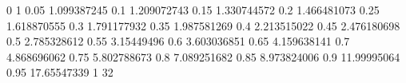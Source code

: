 0 1
0.05 1.099387245
0.1 1.209072743
0.15 1.330744572
0.2 1.466481073
0.25 1.618870555
0.3 1.791177932
0.35 1.987581269
0.4 2.213515022
0.45 2.476180698
0.5 2.785328612
0.55 3.15449496
0.6 3.603036851
0.65 4.159638141
0.7 4.868696062
0.75 5.802788673
0.8 7.089251682
0.85 8.973824006
0.9 11.99995064
0.95 17.65547339
1 32






















